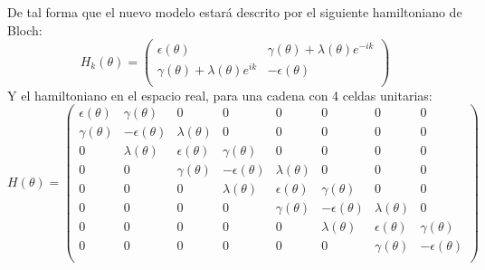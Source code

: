 De tal forma que el nuevo modelo estará descrito por el siguiente hamiltoniano de Bloch:
\begin{equation}
    H_k(\theta) =      
     \begin{pmatrix}
            \epsilon(\theta) & \gamma(\theta) + \lambda(\theta) e^{-ik}  \\
            \gamma(\theta) + \lambda(\theta) e^{ik} & -\epsilon(\theta) \\
        \end{pmatrix} 
\end{equation}
Y el hamiltoniano en el espacio real, para una cadena con 4 celdas unitarias:
\begin{equation}
    H (\theta)= 
     \begin{pmatrix}
            \epsilon(\theta) & \gamma(\theta) & 0 & 0 & 0 & 0 & 0 & 0 \\
            \gamma(\theta) & -\epsilon(\theta) & \lambda(\theta) & 0 & 0 & 0 & 0 & 0 \\
            0 & \lambda(\theta) & \epsilon(\theta) & \gamma(\theta) & 0 & 0 & 0 & 0 \\
            0 & 0 & \gamma(\theta) & -\epsilon(\theta) & \lambda(\theta) & 0 & 0 & 0 \\
            0 & 0 & 0 & \lambda(\theta) & \epsilon(\theta) & \gamma(\theta) & 0 & 0 \\
            0 & 0 & 0 & 0 & \gamma(\theta) & -\epsilon(\theta) & \lambda(\theta) & 0 \\
            0 & 0 & 0 & 0 & 0 & \lambda(\theta) & \epsilon(\theta) & \gamma(\theta) \\
            0 & 0 & 0 & 0 & 0 & 0 & \gamma(\theta) & -\epsilon(\theta) \\
            
        \end{pmatrix}
\end{equation}

